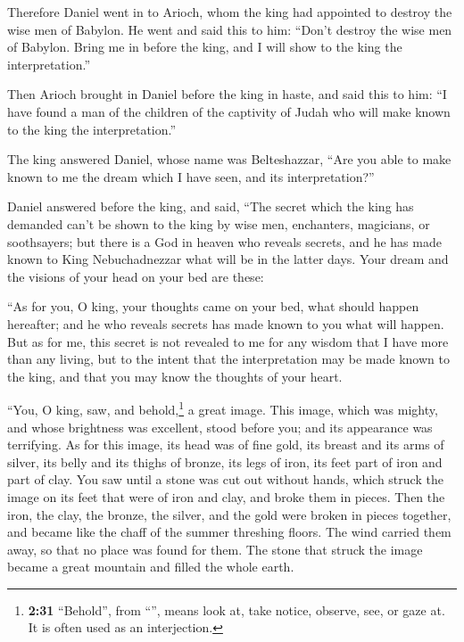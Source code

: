  Therefore Daniel went in to Arioch, whom the king had
appointed to destroy the wise men of Babylon. He went and said this to
him: ``Don't destroy the wise men of Babylon. Bring me in before the
king, and I will show to the king the interpretation.''

 Then Arioch brought in Daniel before the king in haste,
and said this to him: ``I have found a man of the children of the
captivity of Judah who will make known to the king the interpretation.''

 The king answered Daniel, whose name was Belteshazzar,
``Are you able to make known to me the dream which I have seen, and its
interpretation?''

 Daniel answered before the king, and said, ``The secret
which the king has demanded can't be shown to the king by wise men,
enchanters, magicians, or soothsayers;  but there is a
God in heaven who reveals secrets, and he has made known to King
Nebuchadnezzar what will be in the latter days. Your dream and the
visions of your head on your bed are these:

 ``As for you, O king, your thoughts came on your bed,
what should happen hereafter; and he who reveals secrets has made known
to you what will happen.  But as for me, this secret is
not revealed to me for any wisdom that I have more than any living, but
to the intent that the interpretation may be made known to the king, and
that you may know the thoughts of your heart.

 ``You, O king, saw, and behold,\footnote{\textbf{2:31}
  ``Behold'', from ``'', means look at, take notice,
  observe, see, or gaze at. It is often used as an interjection.} a
great image. This image, which was mighty, and whose brightness was
excellent, stood before you; and its appearance was terrifying.
 As for this image, its head was of fine gold, its breast
and its arms of silver, its belly and its thighs of bronze,
 its legs of iron, its feet part of iron and part of
clay.  You saw until a stone was cut out without hands,
which struck the image on its feet that were of iron and clay, and broke
them in pieces.  Then the iron, the clay, the bronze, the
silver, and the gold were broken in pieces together, and became like the
chaff of the summer threshing floors. The wind carried them away, so
that no place was found for them. The stone that struck the image became
a great mountain and filled the whole earth.


